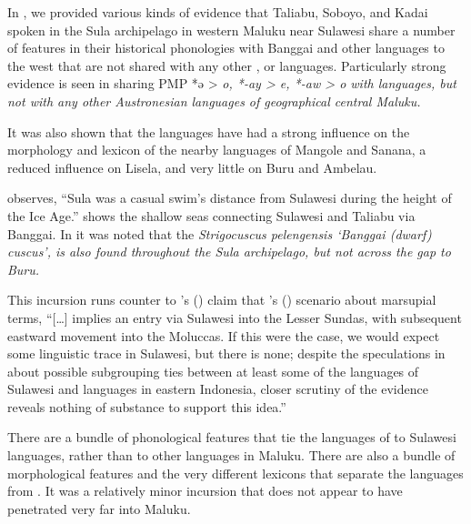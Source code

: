 In , we provided various kinds of evidence that Taliabu,
Soboyo, and Kadai spoken in the Sula archipelago in western Maluku
near Sulawesi share a number of features in their historical
phonologies with Banggai and other  languages to the west that are not shared
with any other ,
 or  languages.
Particularly strong evidence is seen in sharing PMP *ə > \it{o},
*-ay > \it{e}, *-aw > \it{o} with  languages,
but not with any other Austronesian languages of geographical central Maluku.

It was also shown that the  languages have had a
strong influence on the morphology
and lexicon of the nearby  languages of Mangole
and Sanana, a reduced influence on Lisela,
and very little on Buru and Ambelau.

\citet[130]{Bloyd2020} observes, “Sula was a casual swim’s distance
from Sulawesi during the height of the Ice Age.” 
shows the shallow seas connecting Sulawesi
and Taliabu via Banggai.
In  it was noted that the \it{Strigocuscus pelengensis}
‘Banggai (dwarf) cuscus’, is also found throughout the Sula archipelago,
but not across the gap to Buru.

This incursion runs counter to \citeauthor{Blust2012b}'s (\citeyear[274]{Blust2012b}) claim
that \citeauthor{Schapper2011}’s (\citeyear{Schapper2011}) scenario about marsupial terms,
“[\ldots] implies an entry via Sulawesi into the Lesser Sundas,
with subsequent eastward movement into the Moluccas.
If this were the case,
we would expect some linguistic trace in Sulawesi,
but there is none; despite the speculations in \citet{DonohueGrimes2008}
about possible subgrouping ties between at least some of the
languages of Sulawesi and languages in eastern Indonesia,
closer scrutiny of the evidence reveals nothing of substance
to support this idea.”

There are a bundle of phonological features that tie the languages
of  to Sulawesi languages, rather than to other languages in Maluku.
There are also a bundle of morphological features
and the very different lexicons that separate
the  languages from .
It was a relatively minor incursion that does not appear to have
penetrated very far into Maluku.